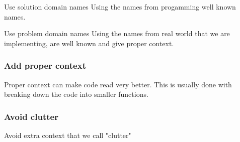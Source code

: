 \documentclass{beamer}
\begin{document}
\begin{frame}{Use solution domain names}
  Using the names from progamming well known names.
\end{frame}

\begin{frame}{Use problem domain names}
  Using the names from real world that we are implementing, are well known and give proper context.
\end{frame}

\begin{frame}
  \frametitle{Add proper context}
  Proper context can make code read very better.
  This is usually done with breaking down the code into smaller functions.
\end{frame}

\begin{frame}
  \frametitle{Avoid clutter}
  Avoid extra context that we call "clutter"
\end{frame}
\end{document}
